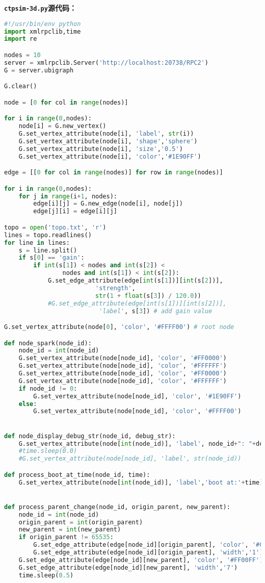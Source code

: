 \noindent\bfseries\texttt{ctpsim-3d.py}源代码：
\begin{lstlisting}[language=Python,tabsize=2]
#!/usr/bin/env python
import xmlrpclib,time
import re

nodes = 10
server = xmlrpclib.Server('http://localhost:20738/RPC2')
G = server.ubigraph

G.clear()

node = [0 for col in range(nodes)]

for i in range(0,nodes):
	node[i] = G.new_vertex()
	G.set_vertex_attribute(node[i], 'label', str(i))
	G.set_vertex_attribute(node[i], 'shape','sphere')
	G.set_vertex_attribute(node[i], 'size','0.5')
	G.set_vertex_attribute(node[i], 'color','#1E90FF')

edge = [[0 for col in range(nodes)] for row in range(nodes)]

for i in range(0,nodes):
	for j in range(i+1, nodes):
		edge[i][j] = G.new_edge(node[i], node[j])
		edge[j][i] = edge[i][j]

topo = open('topo.txt', 'r')
lines = topo.readlines()
for line in lines:
	s = line.split()
	if s[0] == 'gain':
		if int(s[1]) < nodes and int(s[2]) < 
				nodes and int(s[1]) < int(s[2]):
			G.set_edge_attribute(edge[int(s[1])][int(s[2])],
					     'strength',
					     str(1 + float(s[3]) / 120.0))
			#G.set_edge_attribute(edge[int(s[1])][int(s[2])],
					      'label', s[3]) # add gain value

G.set_vertex_attribute(node[0], 'color', '#FFFF00') # root node

def node_spark(node_id):
	node_id = int(node_id)
	G.set_vertex_attribute(node[node_id], 'color', '#FF0000')
	G.set_vertex_attribute(node[node_id], 'color', '#FFFFFF')
	G.set_vertex_attribute(node[node_id], 'color', '#FF0000')
	G.set_vertex_attribute(node[node_id], 'color', '#FFFFFF')
	if node_id != 0:
		G.set_vertex_attribute(node[node_id], 'color', '#1E90FF')
	else:
		G.set_vertex_attribute(node[node_id], 'color', '#FFFF00')


def node_display_debug_str(node_id, debug_str):
	G.set_vertex_attribute(node[int(node_id)], 'label', node_id+": "+debug_str)
	#time.sleep(0.0)
	#G.set_vertex_attribute(node[node_id], 'label', str(node_id))

def process_boot_at_time(node_id, time):
	G.set_vertex_attribute(node[int(node_id)], 'label','boot at:'+time)


def process_parent_change(node_id, origin_parent, new_parent):
	node_id = int(node_id)
	origin_parent = int(origin_parent)
	new_parent = int(new_parent)
	if origin_parent != 65535:
		G.set_edge_attribute(edge[node_id][origin_parent], 'color', '#C0C0C0')
		G.set_edge_attribute(edge[node_id][origin_parent], 'width','1')
	G.set_edge_attribute(edge[node_id][new_parent], 'color', '#FF00FF')
	G.set_edge_attribute(edge[node_id][new_parent], 'width','7')
	time.sleep(0.5)


\end{lstlisting}
